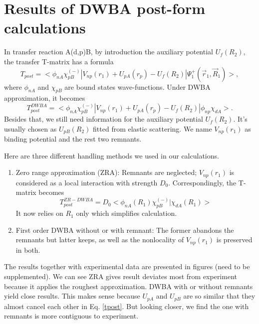 \section{Results of DWBA post-form calculations}
In transfer reaction A(d,p)B, by introduction the auxiliary potential $U_f(R_2)$, the transfer T-matrix has a formula
\begin{equation}
	T_{post}=<\phi_{nA}\chi_{pB}^{(-)}\left|V_{np}(r_1)+U_{pA}(r_p)-U_f(R_2)\right|\Psi_1^+(\vec{r}_1,\vec{R}_1)>,
\end{equation}
where $\phi_{nA}$ and $\chi_{pB}$ are bound states wave-functions. 
Under DWBA approximation, it becomes
\begin{equation}\label{tpost}
	T_{post}^{DWBA}=<\phi_{nA}\chi_{pB}^{(-)}\left|V_{np}(r_1)+U_{pA}(r_p)-U_f(R_2)\right|\phi_{np}\chi_{dA}>.
\end{equation}
Besides that, we still need information for the auxiliary potential $U_f(R_2)$. 
It's usually chosen as $U_{pB}(R_2)$ fitted from elastic scattering.
We name $V_{np}(r_1)$ as binding potential and the rest two remnants.

Here are three different handling methods we used in our calculations.
\begin{enumerate}
\item Zero range approximation (ZRA): Remnants are neglected; $V_{np}(r_1)$ is considered as a local interaction with strength $D_0$.
	Correspondingly, the T-matrix becomes
	\begin{equation}
		T_{post}^{ZR-DWBA}=D_0<\phi_{nA}(R_1)\chi_{pB}^{(-)}| \chi_{dA}(R_1)>
	\end{equation}
	It now relies on $R_1$ only which simplifies calculation.
	\item First order DWBA without or with remnant: The former abandons the remnants but latter keeps, as well as the nonlocality of $V_{np}(r_1)$ is preserved in both.
\end{enumerate}

The results together with experimental data are presented in figures (need to be supplemented). 
We can see ZRA gives result deviates most from experiment because it applies the roughest approximation.
DWBA with or without remnants yield close results.
This makes sense because $U_{pA}$ and $U_{pB}$ are so similar that they almost cancel each other in Eq. \ref{tpost}.
But looking closer, we find the one with remnants is more contiguous to experiment.
